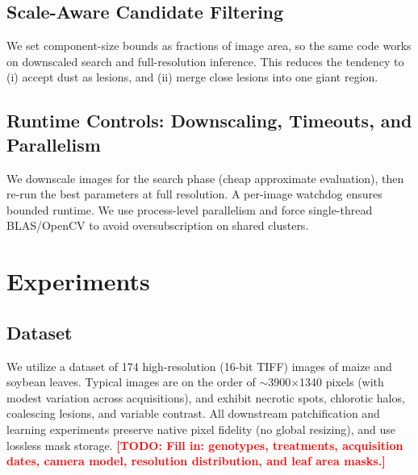 \documentclass[journal]{IEEEtran}
\newcommand{\TODO}[1]{\textcolor{red}{\textbf{[TODO: #1]}}}
\begin{document}
\subsection{Scale-Aware Candidate Filtering}
We set component-size bounds as fractions of image area, so the same code works on downscaled search and full-resolution inference. This reduces the tendency to (i) accept dust as lesions, and (ii) merge close lesions into one giant region.

\subsection{Runtime Controls: Downscaling, Timeouts, and Parallelism}
We downscale images for the search phase (cheap approximate evaluation), then re-run the best parameters at full resolution. A per-image watchdog ensures bounded runtime. We use process-level parallelism and force single-thread BLAS/OpenCV to avoid oversubscription on shared clusters.

\section{Experiments}

\subsection{Dataset}
We utilize a dataset of 174 high-resolution (16-bit TIFF) images of maize and soybean leaves.
Typical images are on the order of $\sim$3900$\times$1340 pixels (with modest variation across acquisitions), and exhibit necrotic spots, chlorotic halos, coalescing lesions, and variable contrast.
All downstream patchification and learning experiments preserve native pixel fidelity (no global resizing), and use lossless mask storage.
\TODO{Fill in: genotypes, treatments, acquisition dates, camera model, resolution distribution, and leaf area masks.}
\end{document}
